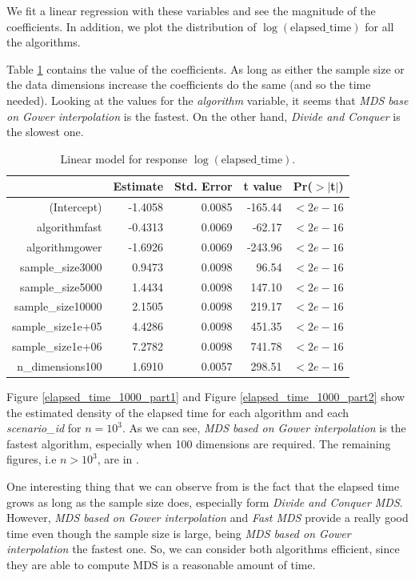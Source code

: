 \documentclass[11pt]{report}
\begin{document}
\indent We fit a linear regression with these
variables and see the magnitude of the coefficients. In addition, we plot the
distribution of $\log(\mbox{elapsed\_time})$ for all the algorithms.

\indent Table \ref{lm_all_variables} contains the value of the coefficients.
As long as either the sample size or the data dimensions increase the 
coefficients do the same (and so the time needed). Looking at the 
values for the \textit{algorithm} variable, it seems that 
\textit{MDS base on Gower interpolation} is the fastest. On the other hand, 
\textit{Divide and Conquer} is the slowest one.

\begin{table}[ht]
\centering
\begin{tabular}{rrrrr}
 & Estimate & Std. Error & t value & Pr($>$$|$t$|$) \\ 
  \hline
(Intercept) & -1.4058 & 0.0085 & -165.44 & $<2e-16$ \\ 
  algorithmfast & -0.4313 & 0.0069 & -62.17 & $<2e-16$ \\ 
  algorithmgower & -1.6926 & 0.0069 & -243.96 & $<2e-16$ \\ 
  sample\_size3000 & 0.9473 & 0.0098 & 96.54 & $<2e-16$ \\ 
  sample\_size5000 & 1.4434 & 0.0098 & 147.10 & $<2e-16$ \\ 
  sample\_size10000 & 2.1505 & 0.0098 & 219.17 & $<2e-16$ \\ 
  sample\_size1e+05 & 4.4286 & 0.0098 & 451.35 & $<2e-16$ \\ 
  sample\_size1e+06 & 7.2782 & 0.0098 & 741.78 & $<2e-16$ \\ 
  n\_dimensions100 & 1.6910 & 0.0057 & 298.51 & $<2e-16$ \\ 
   \hline
\end{tabular}
\caption{Linear model for response $\log(\mbox{elapsed\_time})$.} 
\label{lm_all_variables}
\end{table}

\indent Figure \ref{elapsed_time_1000_part1} and
Figure \ref{elapsed_time_1000_part2} show the estimated density of the
elapsed time for each algorithm and each \textit{scenario\_id} for $n = 10^3$. 
As we can see, \textit{MDS based on Gower interpolation} is the fastest 
algorithm, especially when 100 dimensions are required. The remaining figures, 
i.e $n>10^3$,  are in . 

\indent One interesting thing that we can observe 
from  is the fact that the elapsed time grows as long 
as the sample size does, especially form \textit{Divide and Conquer MDS}.
However, \textit{MDS based on Gower interpolation} and \textit{Fast MDS} 
provide a really good time even though the sample size is large, being
\textit{MDS based on Gower interpolation} the fastest one. So, we can consider
both algorithms efficient, since they are able to compute MDS is a reasonable
amount of time.
\end{document}
